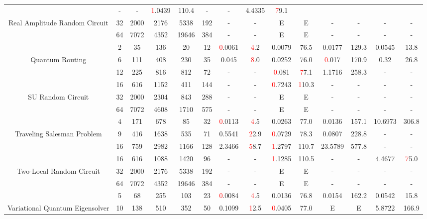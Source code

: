 \begin{table}[htb]
{\begin{tabular}{|c|c|c|c|c|c|c|c|c|c|c|c|c|c|}
 & - & -
 & \textcolor{red}1.0439 & 110.4
 & - & -
 & 4.4335 & \textcolor{red}79.1
 \\
Real Amplitude Random Circuit & 
32 & 2000 & 2176 & 5338 & 192
 & - & -
 & E & E
 & - & -
 & - & -
 \\
 & 
64 & 7072 & 4352 & 19646 & 384
 & - & -
 & E & E
 & - & -
 & - & -
 \\
\hline
 & 
2 & 35 & 136 & 20 & 12
 & \textcolor{red}0.0061 & \textcolor{red}4.2
 & 0.0079 & 76.5
 & 0.0177 & 129.3
 & 0.0545 & 13.8
 \\
Quantum Routing & 
6 & 111 & 408 & 230 & 35
 & 0.045 & \textcolor{red}8.0
 & 0.0252 & 76.0
 & \textcolor{red}0.017 & 170.9
 & 0.32 & 26.8
 \\
 & 
12 & 225 & 816 & 812 & 72
 & - & -
 & \textcolor{red}0.081 & \textcolor{red}77.1
 & 1.1716 & 258.3
 & - & -
 \\
\hline
 & 
16 & 616 & 1152 & 411 & 144
 & - & -
 & \textcolor{red}0.7243 & \textcolor{red}110.3
 & - & -
 & - & -
 \\
SU Random Circuit & 
32 & 2000 & 2304 & 843 & 288
 & - & -
 & E & E
 & - & -
 & - & -
 \\
 & 
64 & 7072 & 4608 & 1710 & 575
 & - & -
 & E & E
 & - & -
 & - & -
 \\
\hline
 & 
4 & 171 & 678 & 85 & 32
 & \textcolor{red}0.0113 & \textcolor{red}4.5
 & 0.0263 & 77.0
 & 0.0136 & 157.1
 & 10.6973 & 306.8
 \\
Traveling Salesman Problem & 
9 & 416 & 1638 & 535 & 71
 & 0.5541 & \textcolor{red}22.9
 & \textcolor{red}0.0729 & 78.3
 & 0.0807 & 228.8
 & - & -
 \\
 & 
16 & 759 & 2982 & 1166 & 128
 & 2.3466 & \textcolor{red}58.7
 & \textcolor{red}1.2797 & 110.7
 & 23.5789 & 577.8
 & - & -
 \\
\hline
 & 
16 & 616 & 1088 & 1420 & 96
 & - & -
 & \textcolor{red}1.1285 & 110.5
 & - & -
 & 4.4677 & \textcolor{red}75.0
 \\
Two-Local Random Circuit & 
32 & 2000 & 2176 & 5338 & 192
 & - & -
 & E & E
 & - & -
 & - & -
 \\
 & 
64 & 7072 & 4352 & 19646 & 384
 & - & -
 & E & E
 & - & -
 & - & -
 \\
\hline
 & 
5 & 68 & 255 & 103 & 23
 & \textcolor{red}0.0084 & \textcolor{red}4.5
 & 0.0136 & 76.8
 & 0.0154 & 162.2
 & 0.0542 & 15.8
 \\
Variational Quantum Eigensolver & 
10 & 138 & 510 & 352 & 50
 & 0.1099 & \textcolor{red}12.5
 & \textcolor{red}0.0405 & 77.0
 & E & E
 & 5.8722 & 166.9
 \\

\end{tabular}}
\end{table}
